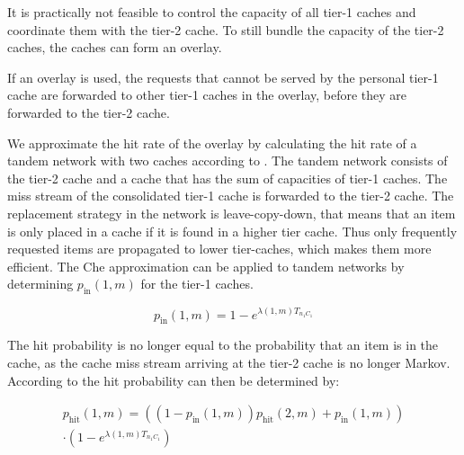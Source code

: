 It is practically not feasible to control the capacity of all tier-1 caches and coordinate them with the tier-2 cache.
To still bundle the capacity of the tier-2 caches, the caches can form an overlay.




If an overlay is used, the requests that cannot be served by the personal tier-1 cache are forwarded to other tier-1 caches in the overlay, before they are forwarded to the tier-2 cache.

We approximate the hit rate of the overlay by calculating the hit rate of a tandem network with two caches according to \cite{martina2014unified}. The tandem network consists of the tier-2 cache and a cache that has the sum of capacities of tier-1 caches. The miss stream of the consolidated tier-1 cache is forwarded to the tier-2 cache.
The replacement strategy in the network is leave-copy-down, that means that an item is only placed in a cache if it is found in a higher tier cache. Thus only frequently requested items are propagated to lower tier-caches, which makes them more efficient. The Che approximation can be applied to tandem networks by determining $p_\text{in}(1,m)$ for the tier-1 caches.

\begin{equation}
p_\text{in}(1,m) = 1-e^{\lambda(1,m)T_{n_1 C_1}}
\end{equation}

The hit probability is no longer equal to the probability that an item is in the cache, as the cache miss stream arriving at the tier-2 cache is no longer Markov. According to \cite{martina2014unified} the hit probability can then be determined by:

\begin{multline}
p_\text{hit}(1,m) = ((1-p_\text{in}(1,m))p_\text{hit}(2,m) + p_\text{in}(1,m)) \\ \cdot(1-e^{\lambda(1,m)T_{n_1 C_1}})
\end{multline}

